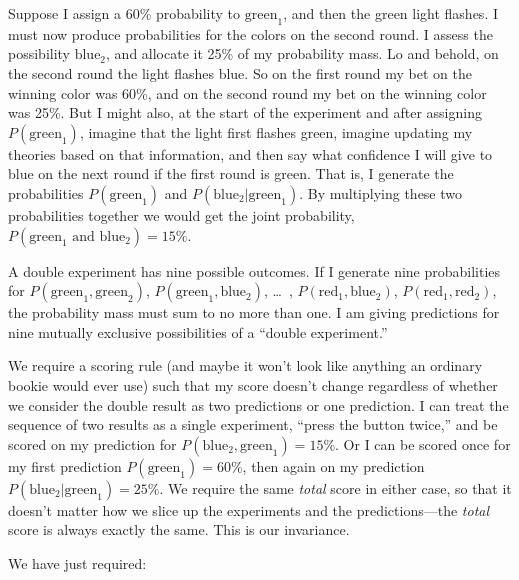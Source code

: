 {
 Suppose I assign a 60\% probability to $\text{green}_{1}$, and
then the green light flashes. I must now produce probabilities for the
colors on the second round. I assess the possibility
$\text{blue}_{2}$, and allocate it 25\% of my probability mass. Lo
and behold, on the second round the light flashes blue. So on the first
round my bet on the winning color was 60\%, and on the second round my
bet on the winning color was 25\%. But I might also, at the start of
the experiment and after assigning $P(\text{green}_{1})$, imagine
that the light first flashes green, imagine updating my theories based
on that information, and then say what confidence I will give to blue
on the next round if the first round is green. That is, I generate the
probabilities $P(\text{green}_{1})$ and
$P(\text{blue}_{2}|\text{green}_{1})$. By
multiplying these two probabilities together we would get the joint
probability, $P(\text{green}_{1} \text{ and } \text{blue}_{2}) =
15\%$.}

{
 A double experiment has nine possible outcomes. If I generate nine
probabilities for $P(\text{green}_{1}, \text{green}_{2})$,
$P(\text{green}_{1}, \text{blue}_{2})$, \ldots~,
$P(\text{red}_{1}, \text{blue}_{2})$, $P(\text{red}_{1},
\text{red}_{2})$, the probability mass must sum to no more than
one. I am giving predictions for nine mutually exclusive possibilities
of a ``double experiment.''}

{
 We require a scoring rule (and maybe it won't look
like anything an ordinary bookie would ever use) such that my score
doesn't change regardless of whether we consider the
double result as two predictions or one prediction. I can treat the
sequence of two results as a single experiment,
``press the button twice,'' and be
scored on my prediction for $P(\text{blue}_{2},
\text{green}_{1}) = 15\%$. Or I can be scored once for my first
prediction $P(\text{green}_{1}) = 60\%$, then again on my
prediction $P(\text{blue}_{2}|\text{green}_{1}) =
25\%$. We require the same \textit{total} score in either case, so that
it doesn't matter how we slice up the experiments and
the predictions---the \textit{total} score is always exactly the same.
This is our invariance.}

{
 We have just required:}


